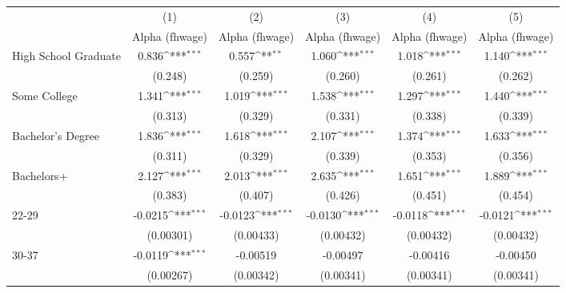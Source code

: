 {
\def\sym#1{\ifmmode^{#1}\else\(^{#1}\)\fi}
\begin{tabular}{l*{5}{c}}
\hline\hline
                    &\multicolumn{1}{c}{(1)}&\multicolumn{1}{c}{(2)}&\multicolumn{1}{c}{(3)}&\multicolumn{1}{c}{(4)}&\multicolumn{1}{c}{(5)}\\
                    &\multicolumn{1}{c}{Alpha (fhwage)}&\multicolumn{1}{c}{Alpha (fhwage)}&\multicolumn{1}{c}{Alpha (fhwage)}&\multicolumn{1}{c}{Alpha (fhwage)}&\multicolumn{1}{c}{Alpha (fhwage)}\\
\hline
High School Graduate&       0.836\sym{***}&       0.557\sym{**} &       1.060\sym{***}&       1.018\sym{***}&       1.140\sym{***}\\
                    &     (0.248)         &     (0.259)         &     (0.260)         &     (0.261)         &     (0.262)         \\
[1em]
Some College        &       1.341\sym{***}&       1.019\sym{***}&       1.538\sym{***}&       1.297\sym{***}&       1.440\sym{***}\\
                    &     (0.313)         &     (0.329)         &     (0.331)         &     (0.338)         &     (0.339)         \\
[1em]
Bachelor's Degree   &       1.836\sym{***}&       1.618\sym{***}&       2.107\sym{***}&       1.374\sym{***}&       1.633\sym{***}\\
                    &     (0.311)         &     (0.329)         &     (0.339)         &     (0.353)         &     (0.356)         \\
[1em]
Bachelors+          &       2.127\sym{***}&       2.013\sym{***}&       2.635\sym{***}&       1.651\sym{***}&       1.889\sym{***}\\
                    &     (0.383)         &     (0.407)         &     (0.426)         &     (0.451)         &     (0.454)         \\
[1em]
22-29               &     -0.0215\sym{***}&     -0.0123\sym{***}&     -0.0130\sym{***}&     -0.0118\sym{***}&     -0.0121\sym{***}\\
                    &   (0.00301)         &   (0.00433)         &   (0.00432)         &   (0.00432)         &   (0.00432)         \\
[1em]
30-37               &     -0.0119\sym{***}&    -0.00519         &    -0.00497         &    -0.00416         &    -0.00450         \\
                    &   (0.00267)         &   (0.00342)         &   (0.00341)         &   (0.00341)         &   (0.00341)         \\

\end{tabular}}
